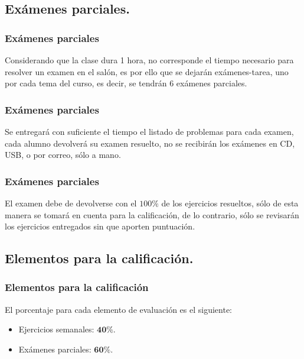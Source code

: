 \subsection{Exámenes parciales.}
\begin{frame}
\frametitle{Exámenes parciales}
Considerando que la clase dura 1 hora, no corresponde el tiempo necesario para resolver un examen en el salón, es por ello que se dejarán exámenes-tarea, uno por cada tema del curso, es decir, se tendrán 6 exámenes parciales.
\end{frame}
\begin{frame}
\frametitle{Exámenes parciales}
Se entregará con suficiente el tiempo el listado de problemas para cada examen, cada alumno devolverá su examen resuelto, no se recibirán los exámenes en CD, USB, o por correo, sólo a mano.
\end{frame}
\begin{frame}
\frametitle{Exámenes parciales}
El examen debe de devolverse con el $100\%$ de los ejercicios resueltos, sólo de esta manera se tomará en cuenta para la calificación, de lo contrario, sólo se revisarán los ejercicios entregados sin que aporten puntuación.
\end{frame}
\subsection{Elementos para la calificación.}
\begin{frame}
\frametitle{Elementos para la calificación}
El porcentaje para cada elemento de evaluación es el siguiente:
\begin{itemize}
\setlength{\itemsep}{0mm}
\item Ejercicios semanales: $\mathbf{40\%}$.
\item Exámenes parciales: $\mathbf{60\%}$.
\end{itemize}
\end{frame}
